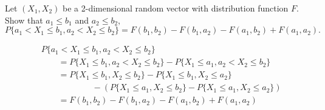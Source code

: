 \begin{exercise}
  Let $(X_1, X_2)$ be a 2-dimensional random vector with distribution function $F$. Show that $a_1\leq b_1$ and $a_2\leq b_2$,
  \[ P\{a_1<X_1\leq b_1, a_2<X_2\leq b_2\} = F(b_1,b_2) - F(b_1, a_2) - F(a_1,b_2) + F(a_1,a_2) .\]
\end{exercise}
\begin{solution}
  \begin{align*}
    & P\{a_1<X_1\leq b_1, a_2<X_2\leq b_2\} \\
      &\qquad= P\{X_1\leq b_1, a_2<X_2\leq b_2\} - P\{X_1\leq a_1, a_2<X_2\leq b_2\} \\
      &\qquad= P\{X_1\leq b_1, X_2\leq b_2\} - P\{X_1\leq b_1, X_2\leq a_2\} \\
      &\qquad\qquad\qquad - (P\{X_1\leq a_1, X_2\leq b_2\} - P\{X_1\leq a_1, X_2\leq a_2\}) \\
      &\qquad= F(b_1,b_2) - F(b_1, a_2) - F(a_1,b_2) + F(a_1,a_2)
  \end{align*}
\end{solution}
